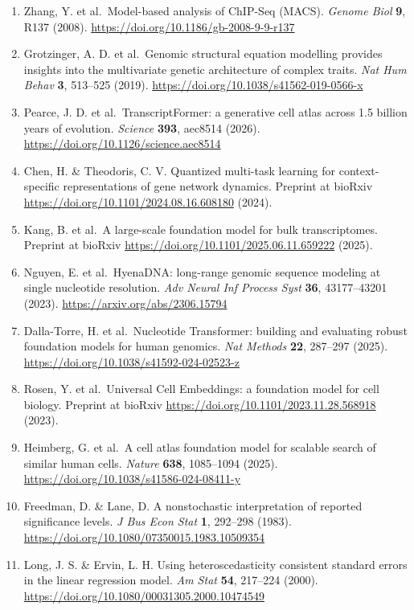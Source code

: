 \begin{enumerate}
\item
  Zhang, Y. et al.~Model-based analysis of ChIP-Seq (MACS). \emph{Genome Biol} \textbf{9}, R137 (2008). \url{https://doi.org/10.1186/gb-2008-9-9-r137}
\item
  Grotzinger, A. D. et al.~Genomic structural equation modelling provides insights into the multivariate genetic architecture of complex traits. \emph{Nat Hum Behav} \textbf{3}, 513--525 (2019). \url{https://doi.org/10.1038/s41562-019-0566-x}
\item
  Pearce, J. D. et al.~TranscriptFormer: a generative cell atlas across 1.5 billion years of evolution. \emph{Science} \textbf{393}, aec8514 (2026). \url{https://doi.org/10.1126/science.aec8514}
\item
  Chen, H. \& Theodoris, C. V. Quantized multi-task learning for context-specific representations of gene network dynamics. Preprint at bioRxiv \url{https://doi.org/10.1101/2024.08.16.608180} (2024).
\item
  Kang, B. et al.~A large-scale foundation model for bulk transcriptomes. Preprint at bioRxiv \url{https://doi.org/10.1101/2025.06.11.659222} (2025).
\item
  Nguyen, E. et al.~HyenaDNA: long-range genomic sequence modeling at single nucleotide resolution. \emph{Adv Neural Inf Process Syst} \textbf{36}, 43177--43201 (2023). \url{https://arxiv.org/abs/2306.15794}
\item
  Dalla-Torre, H. et al.~Nucleotide Transformer: building and evaluating robust foundation models for human genomics. \emph{Nat Methods} \textbf{22}, 287--297 (2025). \url{https://doi.org/10.1038/s41592-024-02523-z}
\item
  Rosen, Y. et al.~Universal Cell Embeddings: a foundation model for cell biology. Preprint at bioRxiv \url{https://doi.org/10.1101/2023.11.28.568918} (2023).
\item
  Heimberg, G. et al.~A cell atlas foundation model for scalable search of similar human cells. \emph{Nature} \textbf{638}, 1085--1094 (2025). \url{https://doi.org/10.1038/s41586-024-08411-y}
\item
  Freedman, D. \& Lane, D. A nonstochastic interpretation of reported significance levels. \emph{J Bus Econ Stat} \textbf{1}, 292--298 (1983). \url{https://doi.org/10.1080/07350015.1983.10509354}
\item
  Long, J. S. \& Ervin, L. H. Using heteroscedasticity consistent standard errors in the linear regression model. \emph{Am Stat} \textbf{54}, 217--224 (2000). \url{https://doi.org/10.1080/00031305.2000.10474549}

\end{enumerate}
